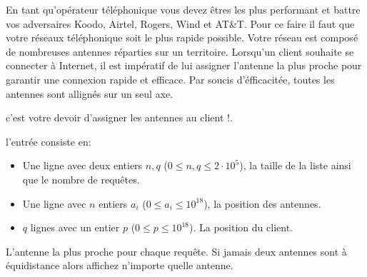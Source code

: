 

\newcommand{\maxa}{123456789}

En tant qu'opérateur téléphonique vous devez êtres les plus performant et battre vos adversaires Koodo, Airtel, Rogers, Wind et AT\&T. Pour ce faire il faut que votre réseaux téléphonique soit le plus rapide possible. Votre réseau est composé de nombreuses antennes réparties sur un territoire. Lorsqu’un client souhaite se connecter à Internet, il est impératif de lui assigner l’antenne la plus proche pour garantir une connexion rapide et efficace. Par soucis d'éfficacitée, toutes les antennes sont allignés sur un seul axe.

c'est votre devoir d'assigner les antennes au client !.

\begin{Input}
    l'entrée consiste en:
    \begin{itemize}
        \item Une ligne avec deux entiers $n, q$ ($0\leq n, q\leq 2 \cdot 10^5$), la taille de la liste ainsi que le nombre de requêtes.
        \item Une ligne avec $n$ entiers $a_i$ ($0  \leq a_i \leq 10^{18}$), la position des antennes.
        \item $q$ lignes avec un entier $p$ ($0 \leq p \leq 10^{18}$). La position du client.
    \end{itemize}
\end{Input}

\begin{Output}
    L'antenne la plus proche pour chaque requête. Si jamais deux antennes sont à équidistance alors affichez n'importe quelle antenne.
\end{Output}
